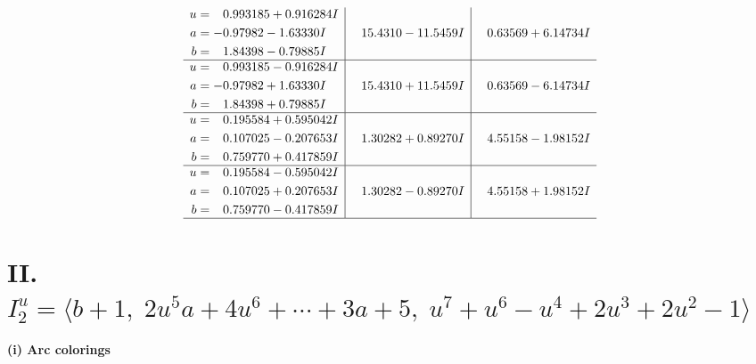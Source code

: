\documentclass[1p]{elsarticle_modified}
\theoremstyle{definition}
\begin{document}
$$\begin{array}{c|c|c}
\begin{aligned}
u &= \phantom{-}0.993185 + 0.916284 I \\
a &= -0.97982 - 1.63330 I \\
b &= \phantom{-}1.84398 - 0.79885 I\end{aligned}
 & \phantom{-}15.4310 - 11.5459 I & \phantom{-}0.63569 + 6.14734 I \\ \hline\begin{aligned}
u &= \phantom{-}0.993185 - 0.916284 I \\
a &= -0.97982 + 1.63330 I \\
b &= \phantom{-}1.84398 + 0.79885 I\end{aligned}
 & \phantom{-}15.4310 + 11.5459 I & \phantom{-}0.63569 - 6.14734 I \\ \hline\begin{aligned}
u &= \phantom{-}0.195584 + 0.595042 I \\
a &= \phantom{-}0.107025 - 0.207653 I \\
b &= \phantom{-}0.759770 + 0.417859 I\end{aligned}
 & \phantom{-}1.30282 + 0.89270 I & \phantom{-}4.55158 - 1.98152 I \\ \hline\begin{aligned}
u &= \phantom{-}0.195584 - 0.595042 I \\
a &= \phantom{-}0.107025 + 0.207653 I \\
b &= \phantom{-}0.759770 - 0.417859 I\end{aligned}
 & \phantom{-}1.30282 - 0.89270 I & \phantom{-}4.55158 + 1.98152 I\\
 \hline 
 \end{array}$$\newpage\newpage\renewcommand{\arraystretch}{1}
\centering \section*{II. $I^u_{2}= \langle b+1,\;2 u^5 a+4 u^6+\cdots+3 a+5,\;u^7+u^6- u^4+2 u^3+2 u^2-1 \rangle$}
\flushleft \textbf{(i) Arc colorings}\\
\end{document}
